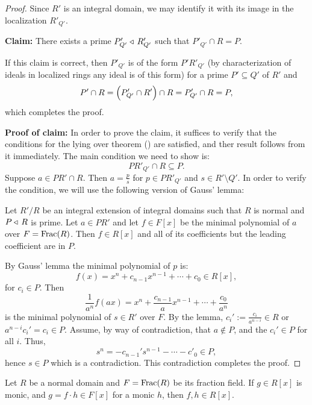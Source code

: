 \documentclass[11pt,a4paper]{article}
\begin{document}
\begin{proof}
  Since $R'$ is an integral domain, we may identify it with its image
  in the localization $R'_{Q'}$.

  \noindent
  \textbf{Claim:} There exists a prime $P'_{Q'} \triangleleft\, R'_{Q'}$
  such that $P'_{Q'} \cap R = P$.

  \noindent
  If this claim is correct, then $P'_{Q'}$ is of the form
  $P' R'_{Q'}$ (by characterization of ideals in localized rings any ideal
  is of this form) for a prime $P' \subseteq Q'$ of $R'$
  and
  \[
    P' \cap R = \del{P'_{Q'} \cap R'} \cap R = P'_{Q'} \cap R = P,
  \]
  which completes the proof.

  \noindent
  \textbf{Proof of claim:}
  In order to prove the claim, it suffices to verify that the conditions
  for the lying over theorem () are satisfied,
  and ther result follows from it immediately.
  The main condition we need to show is:
  \[
    P R'_{Q'} \cap R \subseteq P.
  \]
  Suppose $a \in P R' \cap R$.
  Then $a = \frac{p}{s}$ for $p \in P R'_{Q'}$ and $s \in R' \setminus Q'$.
  In order to verify the condition, we will use the following
  version of Gauss' lemma:

  \begin{lemma}
    \label{lem:gauss}
    Let $R'/R$ be an integral extension of integral domains such that
    $R$ is normal and $P \triangleleft\, R$ is prime.
    Let $a \in P R'$ and let $f \in F[x]$ be the minimal polynomial
    of $a$ over $F = \operatorname{Frac}(R)$.
    Then $f \in R[x]$ and all of its coefficients
    but the leading coefficient are in $P$.
  \end{lemma}

  By Gauss' lemma the minimal polynomial of $p$ is:
  \[
    f(x) = x^n + c_{n-1} x^{n-1} + \cdots + c_0 \in R[x],
  \]
  for $c_i \in P$.
  Then
  \[
    \frac{1}{a^n} f(ax) =
    x^n + \frac{c_{n-1}}{a} x^{n-1} + \cdots + \frac{c_0}{a^n}
  \]
  is the minimal polynomial of $s \in R'$ over $F$.
  By the lemma, $c_i' := \frac{c_i}{a^{n-i}} \in R$
  or $a^{n-i} c_i' = c_i \in P$.
  Assume, by way of contradiction, that $a \notin P$,
  and the $c_i' \in P$ for all $i$.
  Thus,
  \[
    s^n = -c_{n-1}' s^{n-1} - \cdots - c'_0 \in P,
  \]
  hence $s \in P$ which is a contradiction.
  This contradiction completes the proof.
\end{proof}


\begin{exercise}
  \label{ex:gauss-lemma}
  Let $R$ be a normal domain and $F = \operatorname{Frac}(R)$ be its fraction field.
  If $g \in R[x]$ is monic, and $g = f \cdot h \in F[x]$ for a monic
  $h$, then $f,h \in R[x]$.
\end{exercise}
\end{document}
